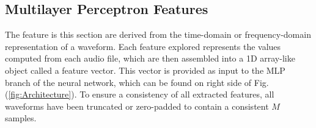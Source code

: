\documentclass[conference,twocolumn,letterpaper]{IEEEtran}
\begin{document}

\subsection{Multilayer Perceptron Features}
\label{subsec:Features}

The feature is this section are derived from the time-domain or frequency-domain representation of a waveform. Each feature explored represents the values computed from each audio file, which are then assembled into a 1D array-like object called a feature vector. This vector is provided as input to the MLP branch of the neural network, which can be found on right side of Fig. (\ref{fig:Architecture}). To ensure a consistency of all extracted features, all waveforms have been truncated or zero-padded to contain a consistent $M$ samples.
\end{document}
